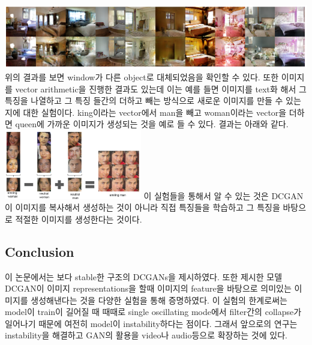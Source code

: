 \documentclass[extendedabs]{bmvc2k}
\begin{document}
 \newline  \includegraphics[width=\linewidth]{images/03_DCGAN.PNG}
 위의 결과를 보면 window가 다른 object로 대체되었음을 확인할 수 있다.
 또한 이미지를 vector arithmetic을 진행한 결과도 있는데 이는 예를 들면 이미지를 text화 해서 그 특징을 나열하고 그 특징 들간의 더하고 빼는 방식으로 새로운 이미지를 만들 수 있는지에 대한 실험이다.
 king이라는 vector에서 man을 빼고 woman이라는 vector을 더하면 queen에 가까운 이미지가 생성되는 것을 예로 들 수 있다. 결과는 아래와 같다.
 \newline  \includegraphics[width=6cm]{images/04_DCGAN.PNG}
 \newline 이 실험들을 통해서 알 수 있는 것은 DCGAN이 이미지를 복사해서 생성하는 것이 아니라 직접 특징들을 학습하고 그 특징을 바탕으로 적절한 이미지를 생성한다는 것이다.

 \subsection{Conclusion}
 \quad 이 논문에서는 보다 stable한 구조의 DCGANs을 제시하였다. 또한 제시한 모델 DCGAN이 이미지 representations을 할때 이미지의 feature을 바탕으로 의미있는 이미지를 
 생성해낸다는 것을 다양한 실험을 통해 증명하였다. 이 실험의 한계로써는 model이 train이 길어질 때 때때로 single oscillating mode에서
 filter간의 collapse가 일어나기 때문에 여전히 model이 instability하다는 점이다.
 그래서 앞으로의 연구는 instability을 해결하고 GAN의 활용을 video나 audio등으로 확장하는 것에 있다.

\newpage

\end{document}
